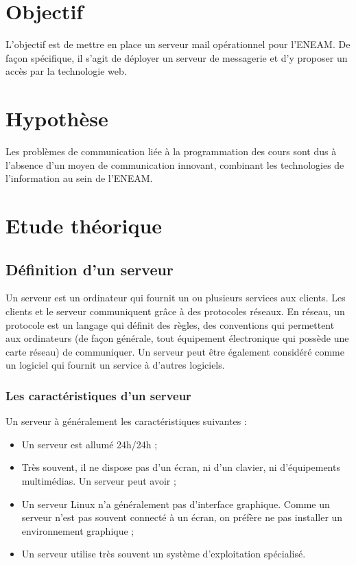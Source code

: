 \documentclass[a4paper,12pt,french]{report} %
\begin{document}
\section{Objectif}
	L'objectif est de mettre en place un serveur mail opérationnel pour l'ENEAM. De façon spécifique, il s'agit de déployer un serveur de messagerie et d'y proposer un accès par la technologie web.
	\section{Hypothèse}
	Les problèmes de communication liée à la programmation des cours sont dus à l'absence d'un moyen de communication innovant, combinant les technologies de l'information au sein de l'ENEAM.
	\section{Etude théorique}
		\subsection{Définition d'un serveur}
		Un serveur est un ordinateur qui fournit un ou plusieurs services aux clients. Les clients et le serveur communiquent grâce à des protocoles réseaux. En réseau, un protocole est un langage qui définit des règles, des conventions qui permettent aux ordinateurs (de façon générale, tout équipement électronique qui possède une carte réseau) de communiquer. Un serveur peut être également considéré comme un logiciel qui fournit un service à d'autres logiciels.

\subsubsection{Les caractéristiques d'un serveur}
Un serveur à généralement les caractéristiques suivantes :
\begin{itemize}
\item Un serveur est allumé 24h/24h ;
\item Très souvent, il ne dispose pas d'un écran, ni d'un clavier, ni d'équipements multimédias. Un serveur peut avoir ;
\item Un serveur Linux n'a généralement pas d'interface graphique. Comme un serveur n'est pas souvent connecté à un écran, on préfère ne pas installer un environnement graphique ;
\item Un serveur utilise très souvent un système d'exploitation spécialisé.
\end{itemize}
\end{document}
